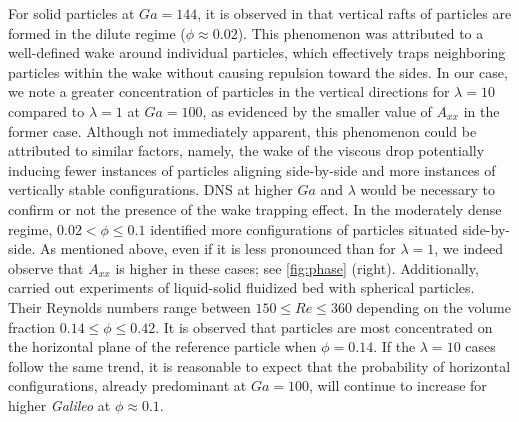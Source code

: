For solid particles at $Ga = 144$, it is observed in \citet{shajahan2023inertial} that vertical rafts of particles are formed in the dilute regime ($\phi \approx 0.02$). This phenomenon was attributed to a well-defined wake around individual particles, which effectively traps neighboring particles within the wake without causing repulsion toward the sides. %
In our case, we note a greater concentration of particles in the vertical directions for $\lambda = 10$ compared to $\lambda = 1$ at $Ga = 100$, as evidenced by the smaller value of $A_{xx}$ in the former case. Although not immediately apparent, this phenomenon could be attributed to similar factors, namely, the wake of the viscous drop potentially inducing fewer instances of particles aligning side-by-side and more instances of vertically stable configurations. DNS at higher $Ga$ and $\lambda$ would be necessary to confirm or not the presence of the wake trapping effect. %
In the moderately dense regime,  $0.02 < \phi \le 0.1$  \citet{shajahan2023inertial} identified more configurations of particles situated side-by-side. 
As mentioned above, even if it is less pronounced than for $\lambda = 1$, we indeed observe that $A_{xx}$ is higher in these cases; see \ref{fig:phase} (right). 
Additionally, \citet{almeras2021statistics} carried out experiments of liquid-solid fluidized bed with spherical particles. 
Their Reynolds numbers range between $150\leq Re \leq 360$ depending on the volume fraction $0.14 \leq \phi \leq 0.42$.
It is observed that particles are most concentrated on the horizontal plane of the reference particle when $\phi = 0.14$.
If the $\lambda = 10$ cases follow the same trend, it is reasonable to expect that the probability of horizontal configurations, already predominant at $Ga =100$, will continue to increase for higher \textit{Galileo} at $\phi  \approx 0.1$.

